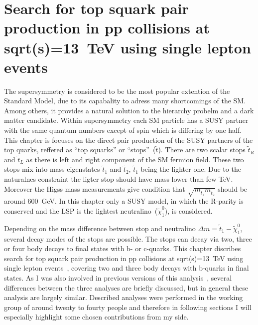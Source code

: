 \chapter{Search for top squark pair production in pp collisions at sqrt(s)=13~TeV using single lepton events}


The supersymmetry is considered to be the most popular extention of the Standard Model, due to its capabality to adress many shortcomings of the SM. Among others, it provides a natural solution to the hierarchy probelm and a dark matter candidate. Within supersymmetry each SM particle has a SUSY partner with the same quantum numbers except of spin which is differing by one half. This chapter is focuses on the direct pair production of the SUSY partners of the top quarks, reffered as ``top squarks'' or ``stops''~($\tilde{t}$). There are two scalar stops $\tilde{t}_{R}$ and  $\tilde{t}_{L}$ as there is left and right component of the SM fermion field. These two stops mix into mass eigenstates $\tilde{t}_{1}$ and $\tilde{t}_{2}$,  $\tilde{t}_{1}$ being the lighter one. Due to the naturalnes constraint the ligter stop should have mass lower than few TeV. Moreover the Higss mass measurements give condition that $\sqrt{m_{\tilde{t}_{1}} m_{\tilde{t}_{2}}}$ should be around 600~GeV. In this chapter only a SUSY model, in which the R-parity is conserved and the LSP is the lightest neutralino~($\tilde{\chi}^{0}_{1}$), is considered.

Depending on the mass difference between stop and neutralino $\Delta m = \tilde{t}_{1} - \tilde{\chi}^{0}_{1}$, several decay modes of the stops are possible. The stops can decay via two, three or four body decays to final states with b- or c-quarks. This chapter discribes search for top squark pair production in pp collisions at sqrt(s)=13~TeV using single lepton events~\cite{Sirunyan:2017xse}, covering two and three body decays with b-quarks in final states. As I was also involved in previous versions of this analysis~\cite{Sirunyan:2016jpr, CMS:2016vew}, several differences between the three analyses are briefly discussed, but in general these analysis are largely similar. Described analyses were performed in the working group of around twenty to fourty people and therefore in following sections I will especially highlight some chosen contributions from my side.

